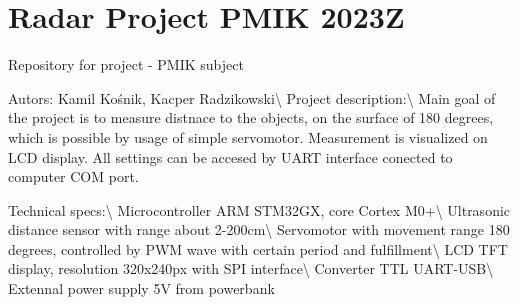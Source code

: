 \chapter{Radar Project PMIK 2023Z}
\hypertarget{md__r_e_a_d_m_e}{}\label{md__r_e_a_d_m_e}
\label{md__r_e_a_d_m_e_autotoc_md15}%
%
Repository for project -\/ PMIK subject

Autors\+: Kamil Kośnik, Kacper Radzikowski\textbackslash{} Project description\+:\textbackslash{} Main goal of the project is to measure distnace to the objects, on the surface of 180 degrees, which is possible by usage of simple servomotor. Measurement is visualized on LCD display. All settings can be accesed by UART interface conected to computer COM port.

Technical specs\+:\textbackslash{} Microcontroller ARM STM32\+GX, core Cortex M0+\textbackslash{} Ultrasonic distance sensor with range about 2-\/200cm\textbackslash{} Servomotor with movement range 180 degrees, controlled by PWM wave with certain period and fulfillment\textbackslash{} LCD TFT display, resolution 320x240px with SPI interface\textbackslash{} Converter TTL UART-\/\+USB\textbackslash{} Extennal power supply 5V from powerbank 